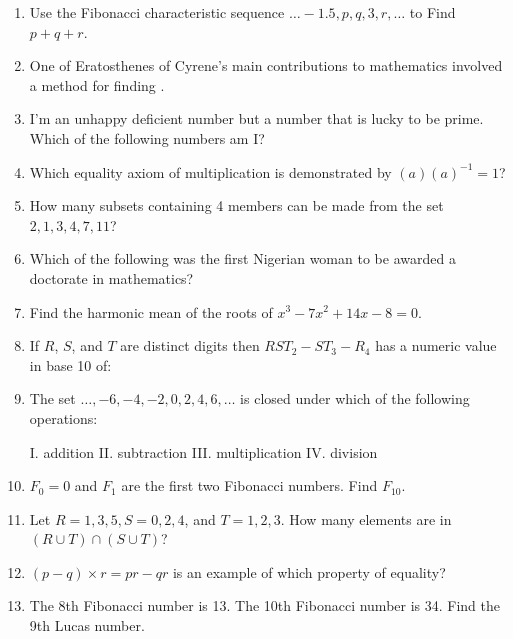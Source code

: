 \documentclass[../uilmath.tex]{subfiles}
\begin{document}
\begin{enumerate}[label=\bfseries\arabic*.]
    \item %
    Use the Fibonacci characteristic sequence $\dots -1.5,p,q,3,r,\dots$ to Find $p+q+r$.

    \item %
    One of Eratosthenes of Cyrene's main contributions to mathematics involved a method for finding \blank .

    \item %
    I'm an unhappy deficient number but a number that is lucky to be prime. Which of the following numbers am I?

    \item %
    Which equality axiom of multiplication is demonstrated by $(a)(a)^{-1}=1$?

    \item %
    How many subsets containing 4 members can be made from the set ${2,1,3,4,7,11}$?

    \item %
    Which of the following was the first Nigerian woman to be awarded a doctorate in mathematics?

    \item %
    Find the harmonic mean of the roots of $x^3-7x^2+14x-8=0$.

    \item %
    If $R$, $S$, and $T$ are distinct digits then $RST_2-ST_3-R_4$ has a numeric value in base 10 of:

    \item %
    The set ${\dots, -6, -4,-2,0,2,4,6,\dots}$ is closed under which of the following operations:
    \begin{center}
        I. addition \qquad II. subtraction \qquad III. multiplication \qquad IV. division 
    \end{center}

    \item %
    $F_0=0$ and $F_1$ are the first two Fibonacci numbers. Find $F_{10}$.

    \item %
    Let $R={1,3,5}, S={0,2,4}$, and $T={1,2,3}$. How many elements are in $(R\cup T)\cap(S\cup T)$?

    \item %
    $(p-q)\times r = pr-qr$ is an example of which property of equality?

    \item %
    The 8th Fibonacci number is 13. The 10th Fibonacci number is 34. Find the 9th Lucas number.


\end{enumerate}
\end{document}
